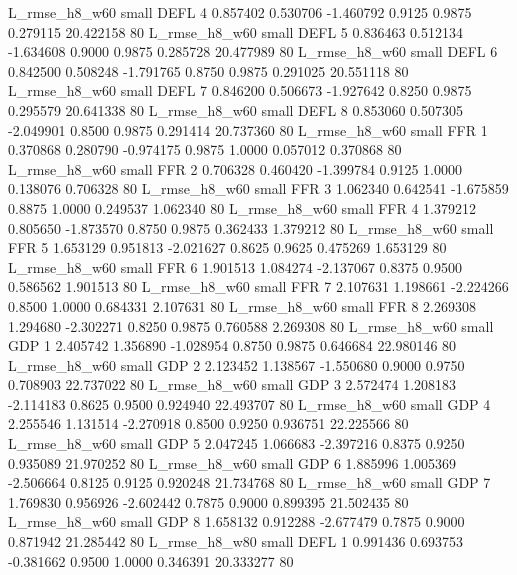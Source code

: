  L_rmse_h8_w60      small     DEFL                 4 0.857402 0.530706 -1.460792 0.9125 0.9875  0.279115   20.422158 80
 L_rmse_h8_w60      small     DEFL                 5 0.836463 0.512134 -1.634608 0.9000 0.9875  0.285728   20.477989 80
 L_rmse_h8_w60      small     DEFL                 6 0.842500 0.508248 -1.791765 0.8750 0.9875  0.291025   20.551118 80
 L_rmse_h8_w60      small     DEFL                 7 0.846200 0.506673 -1.927642 0.8250 0.9875  0.295579   20.641338 80
 L_rmse_h8_w60      small     DEFL                 8 0.853060 0.507305 -2.049901 0.8500 0.9875  0.291414   20.737360 80
 L_rmse_h8_w60      small      FFR                 1 0.370868 0.280790 -0.974175 0.9875 1.0000  0.057012    0.370868 80
 L_rmse_h8_w60      small      FFR                 2 0.706328 0.460420 -1.399784 0.9125 1.0000  0.138076    0.706328 80
 L_rmse_h8_w60      small      FFR                 3 1.062340 0.642541 -1.675859 0.8875 1.0000  0.249537    1.062340 80
 L_rmse_h8_w60      small      FFR                 4 1.379212 0.805650 -1.873570 0.8750 0.9875  0.362433    1.379212 80
 L_rmse_h8_w60      small      FFR                 5 1.653129 0.951813 -2.021627 0.8625 0.9625  0.475269    1.653129 80
 L_rmse_h8_w60      small      FFR                 6 1.901513 1.084274 -2.137067 0.8375 0.9500  0.586562    1.901513 80
 L_rmse_h8_w60      small      FFR                 7 2.107631 1.198661 -2.224266 0.8500 1.0000  0.684331    2.107631 80
 L_rmse_h8_w60      small      FFR                 8 2.269308 1.294680 -2.302271 0.8250 0.9875  0.760588    2.269308 80
 L_rmse_h8_w60      small      GDP                 1 2.405742 1.356890 -1.028954 0.8750 0.9875  0.646684   22.980146 80
 L_rmse_h8_w60      small      GDP                 2 2.123452 1.138567 -1.550680 0.9000 0.9750  0.708903   22.737022 80
 L_rmse_h8_w60      small      GDP                 3 2.572474 1.208183 -2.114183 0.8625 0.9500  0.924940   22.493707 80
 L_rmse_h8_w60      small      GDP                 4 2.255546 1.131514 -2.270918 0.8500 0.9250  0.936751   22.225566 80
 L_rmse_h8_w60      small      GDP                 5 2.047245 1.066683 -2.397216 0.8375 0.9250  0.935089   21.970252 80
 L_rmse_h8_w60      small      GDP                 6 1.885996 1.005369 -2.506664 0.8125 0.9125  0.920248   21.734768 80
 L_rmse_h8_w60      small      GDP                 7 1.769830 0.956926 -2.602442 0.7875 0.9000  0.899395   21.502435 80
 L_rmse_h8_w60      small      GDP                 8 1.658132 0.912288 -2.677479 0.7875 0.9000  0.871942   21.285442 80
 L_rmse_h8_w80      small     DEFL                 1 0.991436 0.693753 -0.381662 0.9500 1.0000  0.346391   20.333277 80
